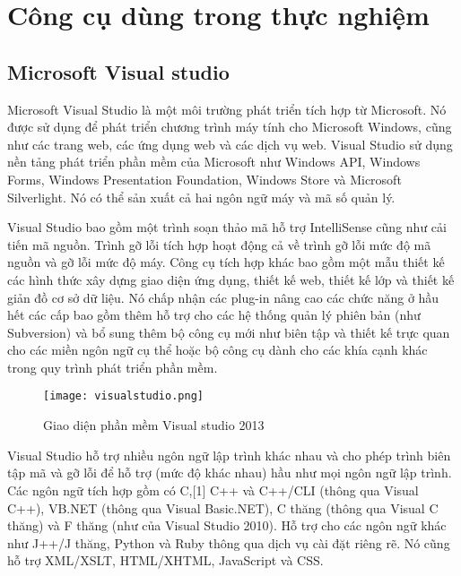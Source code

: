 \section{Công cụ dùng trong thực nghiệm}
\subsection*{Microsoft Visual studio}
Microsoft Visual Studio là một môi trường phát triển tích hợp từ Microsoft. Nó được sử dụng để phát triển chương trình máy tính cho Microsoft Windows, cũng như các trang web, các ứng dụng web và các dịch vụ web. Visual Studio sử dụng nền tảng phát triển phần mềm của Microsoft như Windows API, Windows Forms, Windows Presentation Foundation, Windows Store và Microsoft Silverlight. Nó có thể sản xuất cả hai ngôn ngữ máy và mã số quản lý.

Visual Studio bao gồm một trình soạn thảo mã hỗ trợ IntelliSense cũng như cải tiến mã nguồn. Trình gỡ lỗi tích hợp hoạt động cả về trình gỡ lỗi mức độ mã nguồn và gỡ lỗi mức độ máy. Công cụ tích hợp khác bao gồm một mẫu thiết kế các hình thức xây dựng giao diện ứng dụng, thiết kế web, thiết kế lớp và thiết kế giản đồ cơ sở dữ liệu. Nó chấp nhận các plug-in nâng cao các chức năng ở hầu hết các cấp bao gồm thêm hỗ trợ cho các hệ thống quản lý phiên bản (như Subversion) và bổ sung thêm bộ công cụ mới như biên tập và thiết kế trực quan cho các miền ngôn ngữ cụ thể hoặc bộ công cụ dành cho các khía cạnh khác trong quy trình phát triển phần mềm.

\begin{center}
	\begin{figure}[htp]
		\begin{center}
			\texttt{[image: visualstudio.png]}
		\end{center}
		\caption{Giao diện phần mềm Visual studio 2013}
		\label{refhinh1}
	\end{figure}
\end{center}

Visual Studio hỗ trợ nhiều ngôn ngữ lập trình khác nhau và cho phép trình biên tập mã và gỡ lỗi để hỗ trợ (mức độ khác nhau) hầu như mọi ngôn ngữ lập trình. Các ngôn ngữ tích hợp gồm có C,[1] C++ và C++/CLI (thông qua Visual C++), VB.NET (thông qua Visual Basic.NET), C thăng (thông qua Visual C thăng) và F thăng (như của Visual Studio 2010). Hỗ trợ cho các ngôn ngữ khác như J++/J thăng, Python và Ruby thông qua dịch vụ cài đặt riêng rẽ. Nó cũng hỗ trợ XML/XSLT, HTML/XHTML, JavaScript và CSS.

